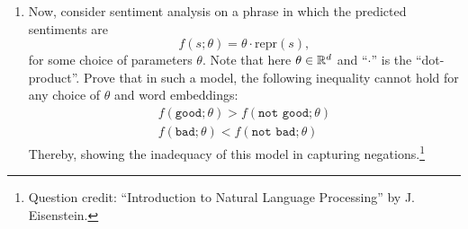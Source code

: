 \begin{enumerate}
    \item  Now, consider sentiment analysis on a phrase in which the predicted sentiments are 
        $$ f(s; \theta) = \theta \cdot \text{repr}(s), $$
        for some choice of parameters $\theta$. 
        Note that here $\theta  \in \mathbb{R}^d$ and ``$\cdot$'' is the ``dot-product''. 
        Prove that in such a model, the following inequality cannot hold for any choice of $\theta$ and word embeddings: 
        \begin{align*}
            f(\texttt{good}; \theta)  > f(\texttt{not good}; \theta)    \\ 
            f(\texttt{bad}; \theta)  < f(\texttt{not bad}; \theta)
        \end{align*}
        Thereby, showing the inadequacy of this model in capturing negations.\footnote{Question credit: ``Introduction to Natural Language Processing'' by J. Eisenstein.} \\ 
   

\end{enumerate}

